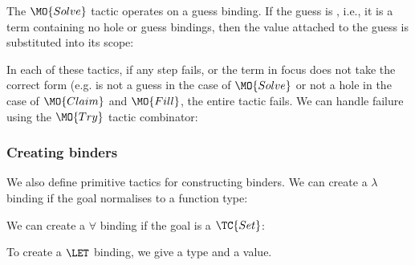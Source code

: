 The $\MO{Solve}$ tactic operates on a guess binding. If the guess is , i.e., it
is a \TT{} term containing no hole or guess bindings, then the value attached to
the guess is substituted into its scope:


In each of these tactics, if any step fails, or the term in focus does not take
the correct form (e.g. is not a guess in the case of $\MO{Solve}$ or not a hole
in the case of $\MO{Claim}$ and $\MO{Fill}$, the entire tactic fails. We can
handle failure using the $\MO{Try}$ tactic combinator:


\subsubsection{Creating binders}

We also define primitive tactics for constructing binders. We can create a $\lambda$
binding if the goal normalises to a function type:


\noindent
We can create a $\forall$ binding if the goal is a $\TC{Set}$:


\noindent
To create a $\LET$ binding, we give a type and a value.


